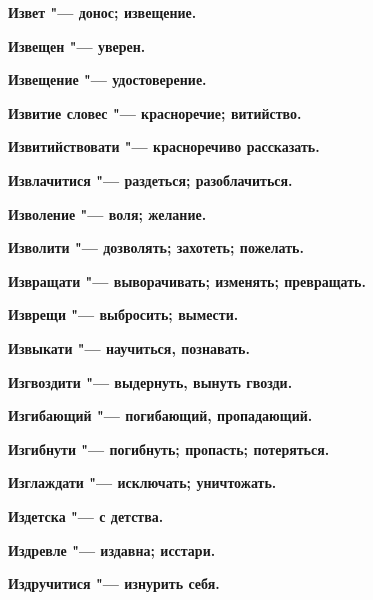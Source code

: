\begin{mymulticols}{2}
\bfseries Извет\normalfont{} "--- донос; извещение. 




\bfseries Извещен\normalfont{} "--- уверен. 




\bfseries Извещение\normalfont{} "--- удостоверение. 




\bfseries Извитие словес\normalfont{} "--- красноречие; витийство. 




\bfseries Извитийствовати\normalfont{} "--- красноречиво рассказать. 




\bfseries Извлачитися\normalfont{} "--- раздеться; разоблачиться. 




\bfseries Изволение\normalfont{} "--- воля; желание. 




\bfseries Изволити\normalfont{} "--- дозволять; захотеть; пожелать. 




\bfseries Извращати\normalfont{} "--- выворачивать; изменять; превращать. 




\bfseries Изврещи\normalfont{} "--- выбросить; вымести. 




\bfseries Извыкати\normalfont{} "--- научиться, познавать. 




\bfseries Изгвоздити\normalfont{} "--- выдернуть, вынуть гвозди. 




\bfseries Изгибающий\normalfont{} "--- погибающий, пропадающий. 




\bfseries Изгибнути\normalfont{} "--- погибнуть; пропасть; потеряться. 




\bfseries Изглаждати\normalfont{} "--- исключать; уничтожать. 




\bfseries Издетска\normalfont{} "--- с детства. 




\bfseries Издревле\normalfont{} "--- издавна; исстари. 




\bfseries Издручитися\normalfont{} "--- изнурить себя. 





\end{mymulticols}
